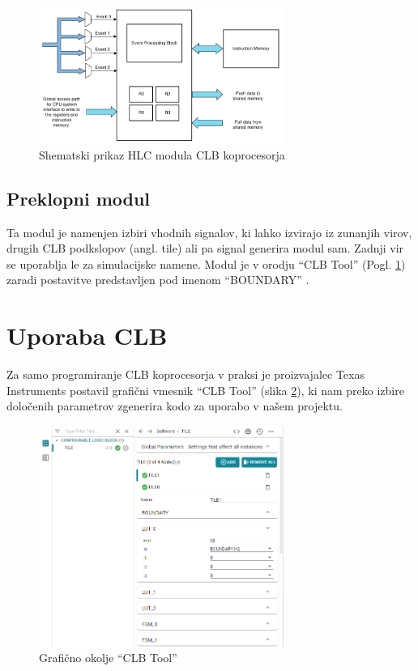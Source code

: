 \documentclass[a4paper]{article}
\begin{document}
\begin{sloppypar}
\begin{figure}[htb]
    \centerline{\includegraphics[width=8cm]{shema_hlc}}
    \caption{Shematski prikaz HLC modula CLB koprocesorja
             \cite[Pogl.~26.4.6]{mcu-ref-manual}}
    \label{fig:hlc} 
\end{figure}

\subsection{Preklopni modul}
Ta modul je namenjen izbiri vhodnih signalov, ki lahko izvirajo iz zunanjih
virov, drugih CLB podkslopov (angl. tile) ali pa signal generira modul sam.
Zadnji vir se uporablja le za simulacijske namene. Modul je v orodju ``CLB
Tool'' (Pogl. \ref{sec:clb_tool}) zaradi postavitve predstavljen pod imenom
``BOUNDARY'' \cite[Pogl.~3.3]{clb-user-guide}.



\section{Uporaba CLB}\label{sec:clb_tool}
Za samo programiranje CLB koprocesorja v praksi je proizvajalec Texas
Instruments postavil grafični vmesnik ``CLB Tool'' (slika \ref{fig:clbtool}),
ki nam preko izbire določenih parametrov zgenerira kodo za uporabo v našem
projektu.

\begin{figure}[htb]
    \centerline{\includegraphics[width=8cm]{clbtool}}
    \caption{Grafično okolje ``CLB Tool''}
    \label{fig:clbtool} 
\end{figure} 


\end{sloppypar}
\end{document}
